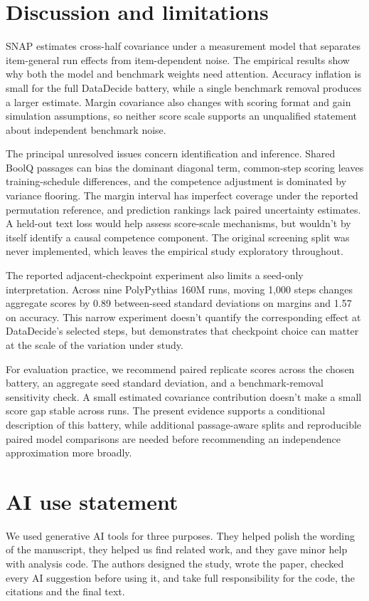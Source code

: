 \documentclass{article}
\begin{document}
\section{Discussion and limitations}
SNAP estimates cross-half covariance under a measurement model that separates item-general run effects from item-dependent noise. The empirical results show why both the model and benchmark weights need attention. Accuracy inflation is small for the full DataDecide battery, while a single benchmark removal produces a larger estimate. Margin covariance also changes with scoring format and gain simulation assumptions, so neither score scale supports an unqualified statement about independent benchmark noise.

The principal unresolved issues concern identification and inference. Shared BoolQ passages can bias the dominant diagonal term, common-step scoring leaves training-schedule differences, and the competence adjustment is dominated by variance flooring. The margin interval has imperfect coverage under the reported permutation reference, and prediction rankings lack paired uncertainty estimates. A held-out text loss would help assess score-scale mechanisms, but wouldn't by itself identify a causal competence component. The original screening split was never implemented, which leaves the empirical study exploratory throughout.

The reported adjacent-checkpoint experiment also limits a seed-only interpretation. Across nine PolyPythias 160M runs, moving 1,000 steps changes aggregate scores by 0.89 between-seed standard deviations on margins and 1.57 on accuracy. This narrow experiment doesn't quantify the corresponding effect at DataDecide's selected steps, but demonstrates that checkpoint choice can matter at the scale of the variation under study.

For evaluation practice, we recommend paired replicate scores across the chosen battery, an aggregate seed standard deviation, and a benchmark-removal sensitivity check. A small estimated covariance contribution doesn't make a small score gap stable across runs. The present evidence supports a conditional description of this battery, while additional passage-aware splits and reproducible paired model comparisons are needed before recommending an independence approximation more broadly.

\clearpage
\section*{AI use statement}
We used generative AI tools for three purposes. They helped polish the wording of the manuscript, they helped us find related work, and they gave minor help with analysis code. The authors designed the study, wrote the paper, checked every AI suggestion before using it, and take full responsibility for the code, the citations and the final text.
\end{document}
